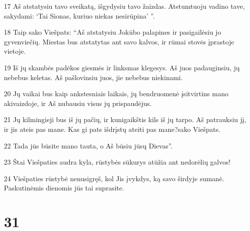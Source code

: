 \par 17 Aš atstatysiu tavo sveikatą, išgydysiu tavo žaizdas. Atstumtuoju vadino tave, sakydami: ‘Tai Sionas, kuriuo niekas nesirūpina’ ”. 
\par 18 Taip sako Viešpats: “Aš atstatysiu Jokūbo palapines ir pasigailėsiu jo gyvenviečių. Miestas bus atstatytas ant savo kalvos, ir rūmai stovės įprastoje vietoje. 
\par 19 Iš jų skambės padėkos giesmės ir linksmas klegesys. Aš juos padauginsiu, jų nebebus keletas. Aš pašlovinsiu juos, jie nebebus niekinami. 
\par 20 Jų vaikai bus kaip ankstesniais laikais, jų bendruomenė įsitvirtins mano akivaizdoje, ir Aš nubausiu visus jų prispaudėjus. 
\par 21 Jų kilmingieji bus iš jų pačių, ir kunigaikštis kils iš jų tarpo. Aš patrauksiu jį, ir jis ateis pas mane. Kas gi pats išdrįstų ateiti pas mane?­sako Viešpats.­ 
\par 22 Tada jūs būsite mano tauta, o Aš būsiu jūsų Dievas”. 
\par 23 Štai Viešpaties audra kyla, rūstybės sūkurys atūžia ant nedorėlių galvos! 
\par 24 Viešpaties rūstybė nenusigręš, kol Jis įvykdys, ką savo širdyje sumanė. Paskutinėmis dienomis jūs tai suprasite.



\chapter{31}


